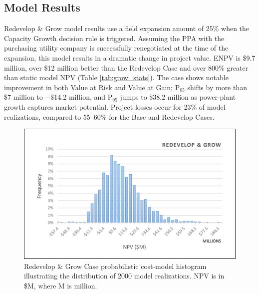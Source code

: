 \subsection{Model Results}\label{ch6:grow_results}

Redevelop \& Grow model results use a field expansion amount of 25\% when the Capacity Growth decision rule is triggered. Assuming the PPA with the purchasing utility company is successfully renegotiated at the time of the expansion, this model results in a dramatic change in project value. ENPV is \$9.7 million, over \$12 million better than the Redevelop Case and over 800\% greater than static model NPV (Table \ref{tab:grow_stats}). The case shows notable improvement in both Value at Risk and Value at Gain; P$_{05}$ shifts by more than \$7 million to $-\$$14.2 million, and P$_{95}$ jumps to \$38.2 million as power-plant growth captures market potential. Project losses occur for 23\% of model realizations, compared to 55--60\% for the Base and Redevelop Cases.

\begin{figure}
\centering
\includegraphics[width=.8\textwidth]{templates/images/Figure-Grow_Case_Histogram.png}
\caption[Redevelop \& Grow Case histogram]{Redevelop \& Grow Case probabilistic cost-model histogram illustrating the distribution of 2000 model realizations. NPV is in \$M, where M is million.}
\label{fig:grow_case_hist}
\end{figure}

